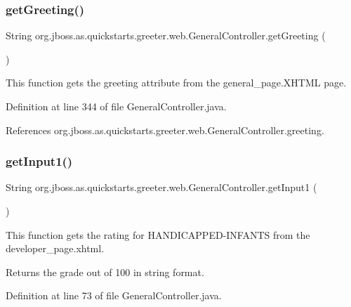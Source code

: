 \subsubsection{\texorpdfstring{get\+Greeting()}{getGreeting()}}
{\footnotesize\ttfamily String org.\+jboss.\+as.\+quickstarts.\+greeter.\+web.\+General\+Controller.\+get\+Greeting (\begin{DoxyParamCaption}{ }\end{DoxyParamCaption})}



This function gets the greeting attribute from the general\+\_\+page.\+X\+H\+T\+ML page. 



Definition at line 344 of file General\+Controller.\+java.



References org.\+jboss.\+as.\+quickstarts.\+greeter.\+web.\+General\+Controller.\+greeting.

\mbox{\label{classorg_1_1jboss_1_1as_1_1quickstarts_1_1greeter_1_1web_1_1_general_controller_a5c23ab308fbd8c66791a3df62b2c8e16}} 
\subsubsection{\texorpdfstring{get\+Input1()}{getInput1()}}
{\footnotesize\ttfamily String org.\+jboss.\+as.\+quickstarts.\+greeter.\+web.\+General\+Controller.\+get\+Input1 (\begin{DoxyParamCaption}{ }\end{DoxyParamCaption})}



This function gets the rating for H\+A\+N\+D\+I\+C\+A\+P\+P\+E\+D-\/\+I\+N\+F\+A\+N\+TS from the developer\+\_\+page.\+xhtml. 

\begin{DoxyReturn}{Returns}
the grade out of 100 in string format. 
\end{DoxyReturn}


Definition at line 73 of file General\+Controller.\+java.



